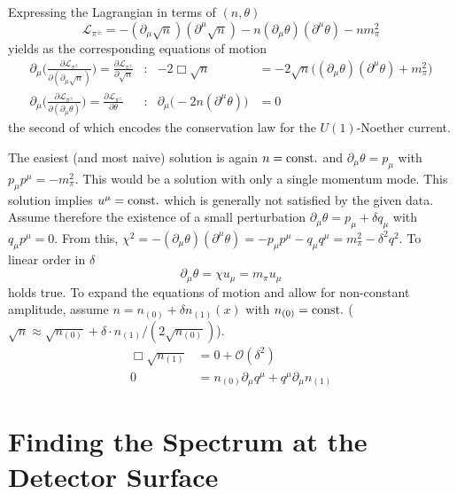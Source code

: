 Expressing the Lagrangian in terms of $(n,\theta)$ 
\begin{equation}
    \mathscr{L}_{\pi^\pm}=-(\partial_\mu\sqrt{n})(\partial^\mu\sqrt{n})-n(\partial_\mu\theta)(\partial^\mu\theta)-nm_\pi^2
\end{equation}
yields as the corresponding equations of motion
\begin{subequations}
    \begin{align}
        \partial_\mu\Bigg(\frac{\partial\mathscr{L}_{\pi^\pm}}{\partial(\partial_\mu\sqrt{n})}\Bigg)=\frac{\partial\mathscr{L}_{\pi^\pm}}{\partial\sqrt{n}}&:&-2\Box\sqrt{n}&=-2\sqrt{n}\big((\partial_\mu\theta)(\partial^\mu\theta)+m_\pi^2\big)\\
        \partial_\mu\Bigg(\frac{\partial\mathscr{L}_{\pi^\pm}}{\partial(\partial_\mu\theta)}\Bigg)=\frac{\partial\mathscr{L}_{\pi^\pm}}{\partial\theta}&:&\partial_\mu\big(-2n(\partial^\mu\theta)\big)&=0
    \end{align}
\end{subequations}
the second of which encodes the conservation law for the $U(1)$-Noether current.
    
The easiest (and most naive) solution is again $n={\text{const.}}$ and $\partial_\mu\theta=p_\mu$ with $p_\mu p^\mu=-m_\pi^2$. This would be a solution with only a single momentum mode. This solution implies $u^\mu={\text{const.}}$ which is generally not satisfied by the given data. Assume therefore the existence of a small perturbation $\partial_\mu\theta=p_\mu+\delta q_\mu$ with $q_\mu p^\mu = 0$. From this, $\chi^2=-(\partial_\mu\theta)(\partial^\mu\theta)=-p_\mu p^\mu-q_\mu q^\mu=m_\pi^2-\delta^2q^2$. To linear order in $\delta$
\begin{equation}
    \partial_\mu\theta=\chi u_\mu=m_\pi u_\mu
\end{equation}
holds true. To expand the equations of motion and allow for non-constant amplitude, assume $n=n_{(0)}+\delta n_{(1)}(x)$ with $n_{(0)}={\text{const.}}$ ($\sqrt{n}\approx\sqrt{n_{(0)}}+\delta\cdot n_{(1)}/(2\sqrt{n_{(0)}})$). 
\begin{subequations}
    \begin{align}
        \Box\sqrt{n_{(1)}}&=0+\mathcal{O}(\delta^2)\\
        0&=n_{(0)}\partial_\mu q^\mu+q^\mu\partial_\mu n_{(1)}
    \end{align}
\end{subequations}


\section{Finding the Spectrum at the Detector Surface}


